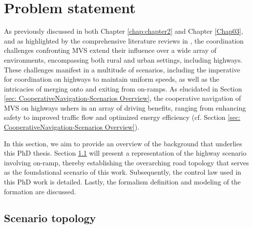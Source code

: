 \section{Problem statement} \label{sec: problem_statement}





As previously discussed in both Chapter \ref{chap:chapter2} and Chapter \ref{Chap03}, and as highlighted by the comprehensive literature reviews in  \cite{bernardin2019scenario} \cite{guo2019urban} \cite{wang2019survey} \cite{7562449}, the coordination challenges confronting MVS extend their influence over a wide array of environments, encompassing both rural and urban settings, including highways. These challenges manifest in a multitude of scenarios, including the imperative for coordination on highways to maintain uniform speeds, as well as the intricacies of merging onto and exiting from on-ramps. As elucidated in Section \ref{sec: CooperativeNavigation-Scenarios Overview}, the cooperative navigation of MVS on highways ushers in an array of driving benefits, ranging from enhancing safety to improved traffic flow and optimized energy efficiency (cf. Section \ref{sec: CooperativeNavigation-Scenarios Overview}). 


In this section, we aim to provide an overview of the background that underlies this PhD thesis. Section \ref{sec:ScenarioTopology} will present a representation of the highway scenario involving on-ramp, thereby establishing the overarching road topology that serves as the foundational scenario of this work. Subsequently, the control law used in this PhD work is detailed. Lastly, the formalism definition and modeling of the formation are discussed. 


\subsection{Scenario topology}\label{sec:ScenarioTopology}


